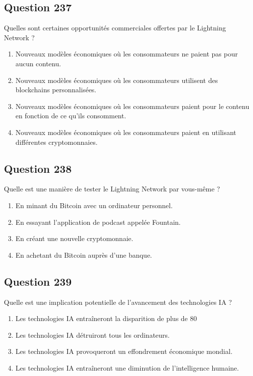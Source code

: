 \documentclass[12pt,a4paper]{article}
\begin{document}
\bigskip


\subsection*{Question 237}
Quelles sont certaines opportunités commerciales offertes par le Lightning Network ?

\begin{enumerate}[label=\Alph*., leftmargin=*]
\item Nouveaux modèles économiques où les consommateurs ne paient pas pour aucun contenu.
\item Nouveaux modèles économiques où les consommateurs utilisent des blockchains personnalisées.
\item Nouveaux modèles économiques où les consommateurs paient pour le contenu en fonction de ce qu'ils consomment.
\item Nouveaux modèles économiques où les consommateurs paient en utilisant différentes cryptomonnaies.
\end{enumerate}

\bigskip


\subsection*{Question 238}
Quelle est une manière de tester le Lightning Network par vous-même ?

\begin{enumerate}[label=\Alph*., leftmargin=*]
\item En minant du Bitcoin avec un ordinateur personnel.
\item En essayant l'application de podcast appelée Fountain.
\item En créant une nouvelle cryptomonnaie.
\item En achetant du Bitcoin auprès d'une banque.
\end{enumerate}

\bigskip


\subsection*{Question 239}
Quelle est une implication potentielle de l'avancement des technologies IA ?

\begin{enumerate}[label=\Alph*., leftmargin=*]
\item Les technologies IA entraîneront la disparition de plus de 80 %
\item Les technologies IA détruiront tous les ordinateurs.
\item Les technologies IA provoqueront un effondrement économique mondial.
\item Les technologies IA entraîneront une diminution de l'intelligence humaine.
\end{enumerate}
\end{document}
